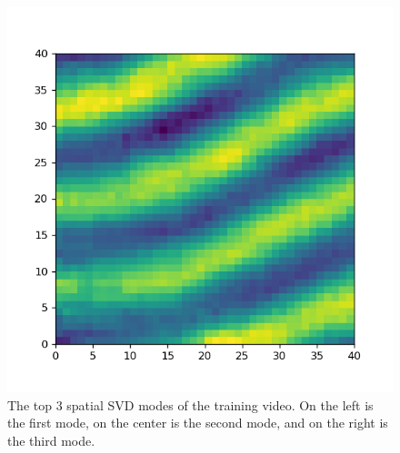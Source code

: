 \documentclass[letterpaper, 10 pt, conference]{ieeeconf}  %
\begin{document}
\begin{figure}[!t]
\endminipage\hfill
{}%
  \includegraphics[width=\linewidth]{images/movie_mode3.png}
\endminipage
\caption{The top 3 spatial SVD modes of the training video. On the left is the first mode, on the center is the second mode, and on the right is the third mode.}
\label{fig:movie_mode}
\end{figure}
\end{document}

